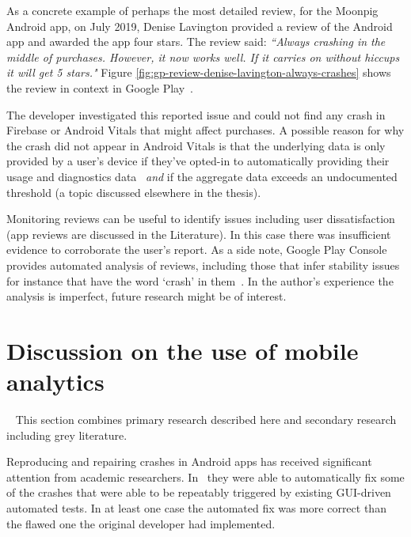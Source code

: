 As a concrete example of perhaps the most detailed review, for the Moonpig Android app, on  July 2019, Denise Lavington provided a review of the Android app and awarded the app four stars. The review said: \emph{``Always crashing in the middle of purchases. However, it now works well. If it carries on without hiccups it will get 5 stars."} Figure \ref{fig:gp-review-denise-lavington-always-crashes} shows the review in context in Google Play~.

The developer investigated this reported issue and could not find any crash in Firebase or Android Vitals that might affect purchases. A possible reason for why the crash did not appear in Android Vitals is that the underlying data is only provided by a user's device if they've opted-in to automatically providing their usage and diagnostics data~ \textit{and} if the aggregate data exceeds an undocumented threshold (a topic discussed elsewhere in the thesis). 

Monitoring reviews can be useful to identify issues including user dissatisfaction (app reviews are discussed in the Literature). In this case there was insufficient evidence to corroborate the user's report. As a side note, Google Play Console provides automated analysis of reviews, including those that infer stability issues for instance that have the word `crash' in them~. In the author's experience the analysis is imperfect, future research might be of interest.






\section{Discussion on the use of mobile analytics}~\label{aiu-discussion-section}
This section combines primary research described here and secondary research including grey literature.


 Reproducing and repairing crashes in Android apps has received significant attention from academic researchers. In~ they were able to automatically fix some of the crashes that were able to be repeatably triggered by existing GUI-driven automated tests. In at least one case the automated fix was more correct than the flawed one the original developer had implemented. 

